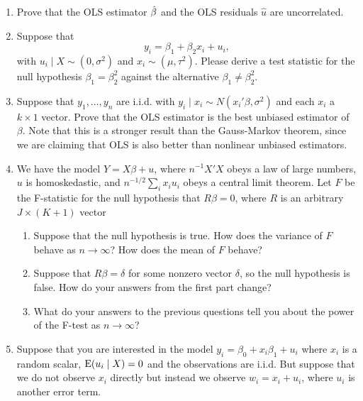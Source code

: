 \begin{enumerate}
\item Prove that the OLS estimator $\hat{\beta}$ and the OLS residuals
  $\hat u$ are uncorrelated.

\item Suppose that 
\begin{equation}
  y_i = \beta_1 + \beta_2 x_i + u_i,  
\end{equation}
with $u_i \mid X \sim (0, \sigma^2)$ and $x_i \sim (\mu,\tau^2)$.
Please derive a test statistic for the null hypothesis $\beta_1 =
\beta_2^2$ against the alternative $\beta_1 \neq \beta_2^2$.

\item Suppose that $y_1,\dots,y_n$ are i.i.d. with $y_i \mid x_i \sim
  N(x_i'\beta, \sigma^2)$ and each $x_i$ a $k \times 1$ vector.  Prove that
  the OLS estimator is the best unbiased estimator of $\beta$.  Note
  that this is a stronger result than the Gauss-Markov theorem, since
  we are claiming that OLS is also better than nonlinear unbiased
  estimators.

\item We have the model $Y = X\beta + u$, where $n^{-1} X'X$ obeys a law
  of large numbers, $u$ is homoskedastic, and $n^{-1/2} \sum_i x_i u_i$
  obeys a central limit theorem.  Let $F$ be the F-statistic for the
  null hypothesis that $R\beta = 0$, where $R$ is an arbitrary $J \times (K +
  1)$ vector
  \begin{enumerate}
  \item Suppose that the null hypothesis is true.  How does the
    variance of $F$ behave as $n \to \infty$?  How does the mean of $F$
    behave?
  \item Suppose that $R\beta = \delta$ for some nonzero vector $\delta$, so the null
    hypothesis is false.  How do your answers from the first part
    change?
  \item What do your answers to the previous questions tell you about
    the power of the F-test as $n \to \infty$?
  \end{enumerate}

\item Suppose that you are interested in the model $y_i = \beta_0 + x_i\beta_1
  + u_i$ where $x_i$ is a random scalar, $\operatorname{E}(u_i \mid X) = 0$ and the
  observations are i.i.d. But suppose that we do not observe $x_i$
  directly but instead we observe $w_i = x_i + u_i$, where $u_i$ is
  another error term.


\end{enumerate}
